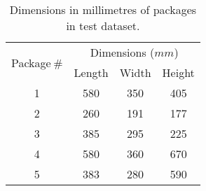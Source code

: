 \begin{table}
\centering
\begin{tabular}{@{} *4c @{}}
\toprule
\multirow{2}{*}{Package$~\#$} & \multicolumn{3}{c}{Dimensions ($mm$)}\\ 
\cmidrule(r){2-4}
 & Length & Width & Height \\
 \midrule
 1 & 580 & 350 & 405 \\ 
 2 & 260 & 191 & 177 \\
 3 & 385 & 295 & 225 \\
 4 & 580 & 360 & 670 \\
 5 & 383 & 280 & 590 \\
\bottomrule
 \end{tabular}
 \caption{Dimensions in millimetres of packages in test dataset.}
\label{table:package_dimensions}
\end{table}